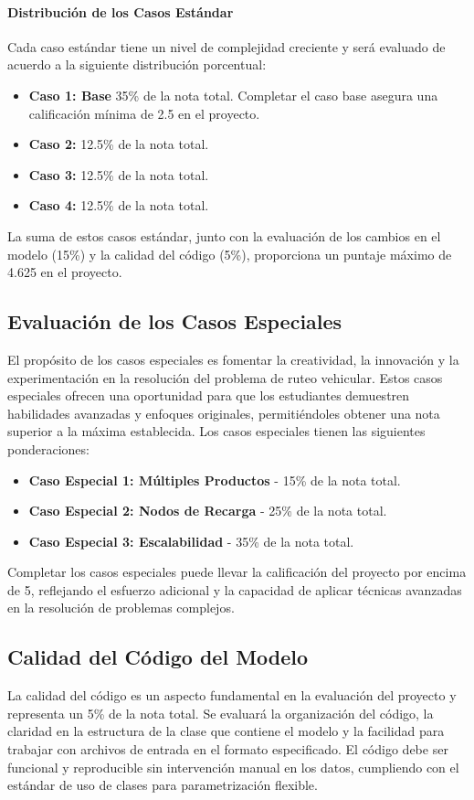 \documentclass[12pt]{article}
\begin{document}
\paragraph{Distribución de los Casos Estándar}
Cada caso estándar tiene un nivel de complejidad creciente y será evaluado de acuerdo a la siguiente distribución porcentual:
\begin{itemize}
    \item \textbf{Caso 1: Base} 35\% de la nota total. Completar el caso base asegura una calificación mínima de 2.5 en el proyecto.
    \item \textbf{Caso 2:} 12.5\% de la nota total.
    \item \textbf{Caso 3:} 12.5\% de la nota total.
    \item \textbf{Caso 4:} 12.5\% de la nota total.
\end{itemize}
La suma de estos casos estándar, junto con la evaluación de los cambios en el modelo (15\%) y la calidad del código (5\%), proporciona un puntaje máximo de 4.625 en el proyecto. 

\subsection{Evaluación de los Casos Especiales}
El propósito de los casos especiales es fomentar la creatividad, la innovación y la experimentación en la resolución del problema de ruteo vehicular. Estos casos especiales ofrecen una oportunidad para que los estudiantes demuestren habilidades avanzadas y enfoques originales, permitiéndoles obtener una nota superior a la máxima establecida. Los casos especiales tienen las siguientes ponderaciones:
\begin{itemize}
    \item \textbf{Caso Especial 1: Múltiples Productos} - 15\% de la nota total.
    \item \textbf{Caso Especial 2: Nodos de Recarga} - 25\% de la nota total.
    \item \textbf{Caso Especial 3: Escalabilidad} - 35\% de la nota total.
\end{itemize}

Completar los casos especiales puede llevar la calificación del proyecto por encima de 5, reflejando el esfuerzo adicional y la capacidad de aplicar técnicas avanzadas en la resolución de problemas complejos.

\subsection{Calidad del Código del Modelo}
La calidad del código es un aspecto fundamental en la evaluación del proyecto y representa un 5\% de la nota total. Se evaluará la organización del código, la claridad en la estructura de la clase que contiene el modelo y la facilidad para trabajar con archivos de entrada en el formato especificado. El código debe ser funcional y reproducible sin intervención manual en los datos, cumpliendo con el estándar de uso de clases para parametrización flexible.
\end{document}

